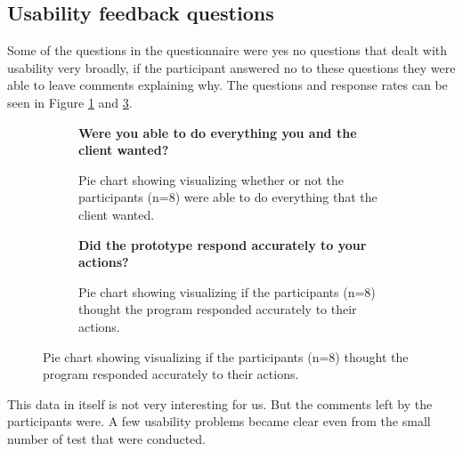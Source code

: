 \subsection{Usability feedback questions}
Some of the questions in the questionnaire were yes no questions that dealt with usability very broadly, if the participant answered no to these questions they were able to leave comments explaining why. The questions and response rates can be seen in Figure \ref{fig:pie1} and \ref{fig:pie2}.
\begin{figure}[H]
	\centering
	\begin{minipage}[b]{0.49\textwidth}
		\begin{figure}[H]
			\centering
		\textbf{	Were you able to do everything you and the client wanted?}
			\caption{Pie chart showing visualizing whether or not the participants (n=8) were able to do everything that the client wanted.}
			\label{fig:pie1}
		\end{figure}
	\end{minipage}
	\hfill
	\begin{minipage}[b]{0.49\textwidth}
		\begin{figure}[H]
			\centering
			\textbf{	Did the prototype respond accurately to your actions?}
			\caption{Pie chart showing visualizing if the participants (n=8) thought the program responded accurately to their actions.}
			\label{fig:pie2}
		\end{figure}
	\end{minipage}
\end{figure}
This data in itself is not very interesting for us. But the comments left by the participants were. A few usability problems became clear even from the small number of test that were conducted.

